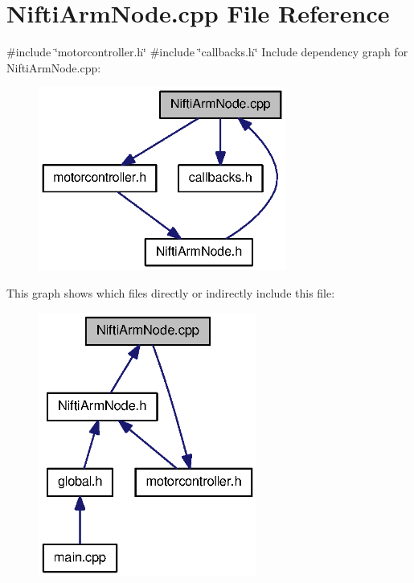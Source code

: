 \section{\-Nifti\-Arm\-Node.\-cpp \-File \-Reference}
\label{NiftiArmNode_8cpp}
{\ttfamily \#include \char`\"{}motorcontroller.\-h\char`\"{}}\*
{\ttfamily \#include \char`\"{}callbacks.\-h\char`\"{}}\*
\-Include dependency graph for \-Nifti\-Arm\-Node.\-cpp\-:
\nopagebreak
\begin{figure}[H]
\begin{center}
\leavevmode
\includegraphics[width=230pt]{NiftiArmNode_8cpp__incl}
\end{center}
\end{figure}
\-This graph shows which files directly or indirectly include this file\-:
\nopagebreak
\begin{figure}[H]
\begin{center}
\leavevmode
\includegraphics[width=203pt]{NiftiArmNode_8cpp__dep__incl}
\end{center}
\end{figure}
